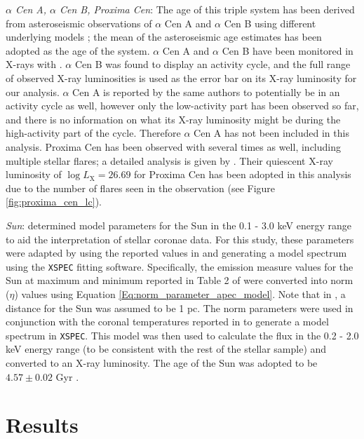 \textit{$\alpha$ Cen A, $\alpha$ Cen B, Proxima Cen}: The age of this triple system has been derived from asteroseismic observations of $\alpha$ Cen A and $\alpha$ Cen B using different underlying models \citep{Miglio_Montalban_2005}; the mean of the asteroseismic age estimates has been adopted as the age of the system. $\alpha$ Cen A and $\alpha$ Cen B have been monitored in X-rays with \XMM \citep{Robrade_etal_2012}. $\alpha$ Cen B was found to display an activity cycle, and the full range of observed X-ray luminosities is used as the error bar on its X-ray luminosity for our analysis. $\alpha$ Cen A is reported by the same authors to potentially be in an activity cycle as well, however only the low-activity part has been observed so far, and there is no information on what its X-ray luminosity might be during the high-activity part of the cycle. Therefore $\alpha$ Cen A has not been included in this analysis. Proxima Cen has been observed with \XMM several times as well, including multiple stellar flares; a detailed analysis is given by \citet{Fuhrmeister_etal_2011}. Their quiescent X-ray luminosity of $\log L_{\mathrm{X}} = 26.69$ for Proxima Cen has been adopted in this analysis due to the number of flares seen in the observation (see Figure \ref{fig:proxima_cen_lc}).

\textit{Sun}: \citet{Peres_etal_2000} determined model parameters for the Sun in the 0.1 - 3.0 keV energy range to aid the interpretation of stellar coronae data. For this study, these parameters were adapted by using the reported values in \citet{Peres_etal_2000} and generating a model spectrum using the \texttt{XSPEC} fitting software. Specifically, the emission measure values for the Sun at maximum and minimum reported in Table 2 of \citet{Peres_etal_2000} were converted into norm ($\eta$) values using Equation \ref{Eq:norm_parameter_apec_model}. Note that in \citet{Peres_etal_2000}, a distance for the Sun was assumed to be 1 pc. The norm parameters were used in conjunction with the coronal temperatures reported in \citet{Peres_etal_2000} to generate a model spectrum in \texttt{XSPEC}. This model was then used to calculate the flux in the 0.2 - 2.0 keV energy range (to be consistent with the rest of the stellar sample) and converted to an X-ray luminosity. The age of the Sun was adopted to be $4.57 \pm 0.02$ Gyr \citep{Bahcall_etal_1995}.

\section{Results}
